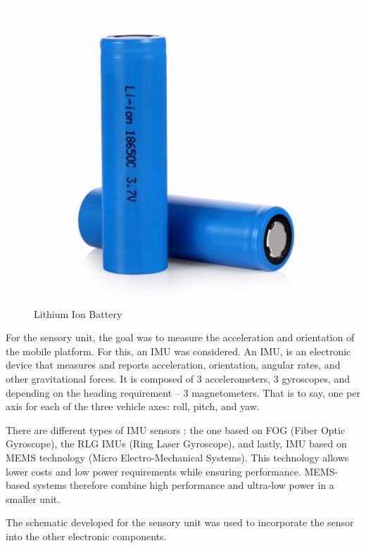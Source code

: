 \begin{figure}[H]
    \centering
    \includegraphics[scale = 0.3]{Figures/lithiumBattery.jpg}
    \caption{Lithium Ion Battery}
    \label{fig:lithiumBattery}
\end{figure}


\vspace{5mm}
For the sensory unit, the goal was to measure the acceleration and orientation of the mobile platform. For this, an \ac{IMU} was considered.
An \ac{IMU}, is an electronic device that measures and reports acceleration, orientation, angular rates, and other gravitational forces. It is composed of 3 accelerometers, 3 gyroscopes, and depending on the heading requirement – 3 magnetometers. That is to say, one per axis for each of the three vehicle axes: roll, pitch, and yaw.

There are different types of \ac{IMU} sensors \cite{noauthor_imu_nodate}: the one based on FOG (Fiber Optic Gyroscope), the RLG \ac{IMU}s (Ring Laser Gyroscope), and lastly, \ac{IMU} based on MEMS technology (Micro Electro-Mechanical Systems). This technology allows lower costs and low power requirements while ensuring performance. MEMS-based systems therefore combine high performance and ultra-low power in a smaller unit.
\par
The schematic developed for the sensory unit was used to incorporate the sensor into the other electronic components.

